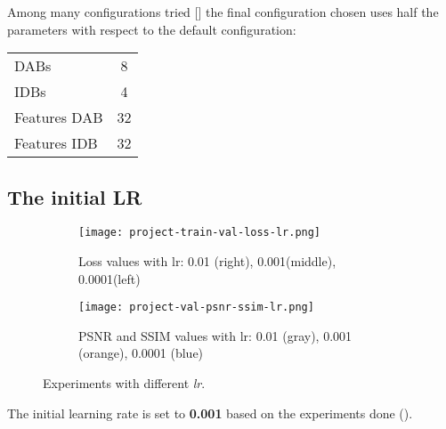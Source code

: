 Among many configurations tried [] the final configuration chosen uses half the parameters with respect to the default configuration:
\begin{tabular}{lc}
    DABs & 8\\
    IDBs & 4\\
    Features DAB & 32 \\
    Features IDB & 32 
\end{tabular}

\subsection{The initial LR}

\begin{figure}
    \begin{subfigure}{\textwidth}
        \centering
        \texttt{[image: project-train-val-loss-lr.png]}
        \caption{Loss values with lr: 0.01 (right), 0.001(middle), 0.0001(left)}
    \end{subfigure}
    \begin{subfigure}{\textwidth}
        \centering
        \texttt{[image: project-val-psnr-ssim-lr.png]}
        \caption{PSNR and SSIM values with lr: 0.01 (gray), 0.001 (orange), 0.0001 (blue)}        
    \end{subfigure}
    \caption{Experiments with different \textit{lr}.}\label{project:lr-experiments}
\end{figure}

The initial learning rate is set to \textbf{0.001} based on the experiments done ().